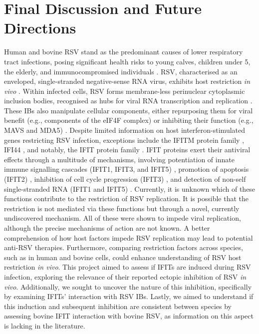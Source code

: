 \chapter{Final Discussion and Future Directions}
Human and bovine RSV stand as the predominant causes of lower respiratory tract infections, posing significant health risks to young calves, children under 5, the elderly, and immunocompromised individuals \cite{Falsey2005RespiratoryAdults, Coultas2019RespiratoryAge}. RSV, characterised as an enveloped, single-stranded negative-sense RNA virus, exhibits host restriction \textit{in vivo} \cite{Buchholz2000ChimericVaccine}. Within infected cells, RSV forms membrane-less perinuclear cytoplasmic inclusion bodies, recognised as hubs for viral RNA transcription and replication \cite{Rincheval2017FunctionalVirus, Jobe2020RespiratorySignaling, Jobe2023ViralCondensates}. These IBs also manipulate cellular components, either repurposing them for viral benefit (e.g., components of the eIF4F complex) \cite{Jobe2023ViralCondensates} or inhibiting their function (e.g., MAVS and MDA5) \cite{Lifland2012HumanMAVS}. Despite limited information on host interferon-stimulated genes restricting RSV infection, exceptions include the IFITM protein family \cite{Smith2019Interferon-InducedMembrane}, IFI44 \cite{McDonald2016ADisease, Li2021IdentificationVirus}, and notably, the IFIT protein family \cite{Drori2020InfluenzaProteins}. IFIT proteins exert their antiviral effects through a multitude of mechanisms, involving potentiation of innate immune signalling cascades (IFIT1, IFIT3, and IFIT5) \cite{Li2009ISG56Response, Reynaud2015IFIT1Interferon, Liu2011IFN-InducedTBK1, Zhang2013IFIT5Pathways}, promotion of apoptosis (IFIT2) \cite{Chen2017InhibitionApoptosis, Diamond2013TheProteins}, inhibition of cell cycle progression (IFIT3) \cite{Xiao2006RIG-GProteins}, and detection of non-self single-stranded RNA (IFIT1 and IFIT5) \cite{Abbas2013StructuralProteins, Pichlmair2011IFIT1RNA, Diamond2014IFIT1:Translation, Mears2018BetterResponse}. Currently, it is unknown which of these functions contribute to the restriction of RSV replication. It is possible that the restriction is not mediated via these functions but through a novel, currently undiscovered mechanism. All of these were shown to impede viral replication, although the precise mechanisms of action are not known. A better comprehension of how host factors impede RSV replication may lead to potential anti-RSV therapies. Furthermore, comparing restriction factors across species, such as in human and bovine cells, could enhance understanding of RSV host restriction \textit{in vivo}. This project aimed to assess if IFITs are induced during RSV infection, exploring the relevance of their reported ectopic inhibition of RSV \textit{in vivo}. Additionally, we sought to uncover the nature of this inhibition, specifically by examining IFITs' interaction with RSV IBs. Lastly, we aimed to understand if this induction and subsequent inhibition are consistent between species by assessing bovine IFIT interaction with bovine RSV, as information on this aspect is lacking in the literature.

